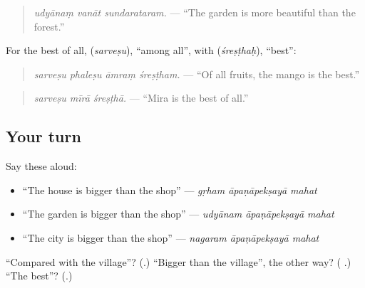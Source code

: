 \begin{quote}
\textbf{  }
\end{quote}

\begin{quote}
\emph{udyānaṃ vanāt sundarataram.} — \textquotedblleft{}The garden is more beautiful than the forest.\textquotedblright{}
\end{quote}

For the best of all, \textbf{} (\emph{sarveṣu}), \textquotedblleft{}among all\textquotedblright{}, with \textbf{} (\emph{śreṣṭhaḥ}), \textquotedblleft{}best\textquotedblright{}:

\begin{quote}
\textbf{   }
\end{quote}

\begin{quote}
\emph{sarveṣu phaleṣu āmraṃ śreṣṭham.} — \textquotedblleft{}Of all fruits, the mango is the best.\textquotedblright{}
\end{quote}

\begin{quote}
\textbf{  }
\end{quote}

\begin{quote}
\emph{sarveṣu mīrā śreṣṭhā.} — \textquotedblleft{}Mira is the best of all.\textquotedblright{}
\end{quote}

\subsection*{Your turn}
Say these aloud:

\begin{itemize}
\raggedright
  \item \textquotedblleft{}The house is bigger than the shop\textquotedblright{} — \emph{gṛham āpaṇāpekṣayā mahat}
  \item \textquotedblleft{}The garden is bigger than the shop\textquotedblright{} — \emph{udyānam āpaṇāpekṣayā mahat}
  \item \textquotedblleft{}The city is bigger than the shop\textquotedblright{} — \emph{nagaram āpaṇāpekṣayā mahat}
\end{itemize}

\begin{tcolorbox}[breakable,colback=teal!4,colframe=teal!35!black,title={Before you move on}]
\textquotedblleft{}Compared with the village\textquotedblright{}? (\textbf{}.) \textquotedblleft{}Bigger than the village\textquotedblright{}, the other way? (\textbf{ }.) \textquotedblleft{}The best\textquotedblright{}? (\textbf{}.)
\end{tcolorbox}
